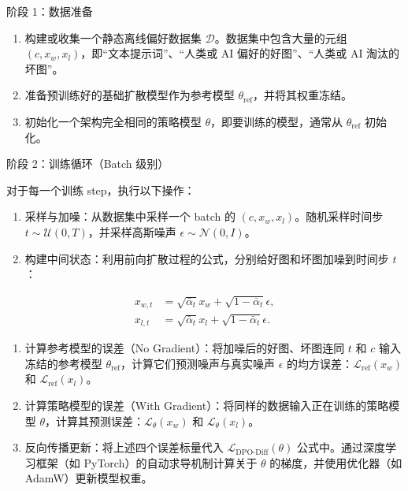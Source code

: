 阶段 1：数据准备

\begin{enumerate}
\def\labelenumi{\arabic{enumi}.}
\tightlist
\item
  构建或收集一个静态离线偏好数据集 \(\mathcal{D}\)。数据集中包含大量的元组 \((c,x_w,x_l)\)，即``文本提示词''、``人类或 AI 偏好的好图''、``人类或 AI 淘汰的坏图''。
\item
  准备预训练好的基础扩散模型作为参考模型 \(\theta_{\mathrm{ref}}\)，并将其权重冻结。
\item
  初始化一个架构完全相同的策略模型 \(\theta\)，即要训练的模型，通常从 \(\theta_{\mathrm{ref}}\) 初始化。
\end{enumerate}

阶段 2：训练循环（Batch 级别）

对于每一个训练 step，执行以下操作：

\begin{enumerate}
\def\labelenumi{\arabic{enumi}.}
\tightlist
\item
  采样与加噪：从数据集中采样一个 batch 的 \((c,x_w,x_l)\)。随机采样时间步 \(t\sim\mathcal{U}(0,T)\)，并采样高斯噪声 \(\epsilon\sim\mathcal{N}(0,I)\)。
\item
  构建中间状态：利用前向扩散过程的公式，分别给好图和坏图加噪到时间步 \(t\)：
\end{enumerate}

\[
\begin{aligned}
x_{w,t} &= \sqrt{\bar{\alpha}_t}x_w+\sqrt{1-\bar{\alpha}_t}\epsilon,\\
x_{l,t} &= \sqrt{\bar{\alpha}_t}x_l+\sqrt{1-\bar{\alpha}_t}\epsilon.
\end{aligned}
\]

\begin{enumerate}
\def\labelenumi{\arabic{enumi}.}
\setcounter{enumi}{2}
\tightlist
\item
  计算参考模型的误差（No Gradient）：将加噪后的好图、坏图连同 \(t\) 和 \(c\) 输入冻结的参考模型 \(\theta_{\mathrm{ref}}\)，计算它们预测噪声与真实噪声 \(\epsilon\) 的均方误差：\(\mathcal{L}_{\mathrm{ref}}(x_w)\) 和 \(\mathcal{L}_{\mathrm{ref}}(x_l)\)。
\item
  计算策略模型的误差（With Gradient）：将同样的数据输入正在训练的策略模型 \(\theta\)，计算其预测误差：\(\mathcal{L}_\theta(x_w)\) 和 \(\mathcal{L}_\theta(x_l)\)。
\item
  反向传播更新：将上述四个误差标量代入 \(\mathcal{L}_{\mathrm{DPO}\text{-}\mathrm{Diff}}(\theta)\) 公式中。通过深度学习框架（如 PyTorch）的自动求导机制计算关于 \(\theta\) 的梯度，并使用优化器（如 AdamW）更新模型权重。
\end{enumerate}

